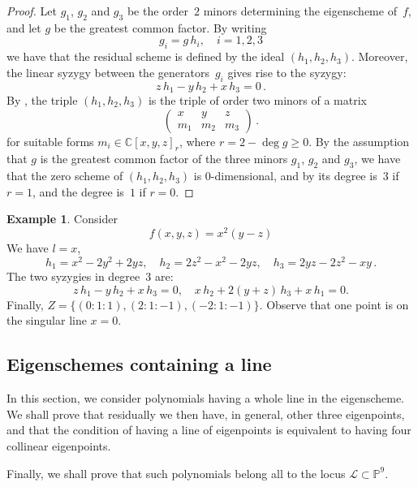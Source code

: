 \documentclass{amsart}
\theoremstyle{plain}
\theoremstyle{definition}
\newtheorem{es}[lemma]{Example}
\newcommand{\C}{\mathbb{C}}
\newcommand{\p}{\mathbb{P}}
\newcommand{\sL}{\mathcal{L}}
\begin{document}
{\begin{proof}
Let $g_1$, $g_2$ and $g_3$ be the order~$2$ minors determining the eigenscheme of~$f$, and let $g$ be the greatest common factor.
By writing
%
\[
  g_i = g \, h_i, \quad i=1,2,3
\]
%
we have that the residual scheme is defined by the ideal
$(h_1,h_2,h_3)$. Moreover, the
linear
syzygy between the generators~$g_i$ gives rise to the syzygy:
%
\[
  z\, h_1 - y\, h_2 + x\, h_3 = 0 \,.
\]
%
By , the triple $(h_1,h_2,h_3)$ is the triple of order two minors of a matrix
%
\[
  \begin{pmatrix}
    x & y & z \\
    m_1 & m_2 & m_3
  \end{pmatrix} \,.
\]
%
for suitable forms $m_i \in \C[x,y,z]_r$, where $r =2 - \deg g \ge 0$.
By the assumption that $g$ is the greatest common factor of the three minors $g_1$, $g_2$ and $g_3$,
we have that the zero scheme of $(h_1,h_2,h_3)$ is $0$-dimensional, and
by  its degree is~$3$ if $r=1$, and the degree is~$1$ if $r=0$.
\end{proof}
}

\begin{es}
Consider
%
\[
  f(x, y, z) = x^2 (y - z)
\]
%
We have $l=x$,
%
\[
 h_1 = x^2-2y^2+2y z, \quad 
 h_2 = 2z^2-x^2-2y z, \quad 
 h_3 = 2yz-2z^2-xy \,.
\]
%
The two syzygies in degree~$3$ are:
%
\[
  z \, h_1 - y \, h_2 + x \, h_3 = 0, \quad x \, h_2 + 2(y+z) \, h_3 + x \, h_1 = 0.
\]
%
Finally, $Z= \{ (0:1:1),(2:1:-1),(-2:1:-1) \}$.
Observe that one point is on the singular line $x=0$.
\end{es}

\subsection{Eigenschemes containing a line}

In this section, we consider polynomials having a whole line in the eigenscheme. We shall prove that residually we then have, in general, other three eigenpoints, and that the condition of having a line of eigenpoints is equivalent to having four collinear eigenpoints.

Finally, we shall prove that such polynomials belong all to the locus $\sL \subset \p^9$.
\end{document}
